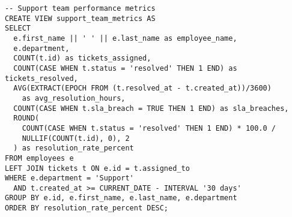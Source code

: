 \begin{verbatim}
-- Support team performance metrics
CREATE VIEW support_team_metrics AS
SELECT 
  e.first_name || ' ' || e.last_name as employee_name,
  e.department,
  COUNT(t.id) as tickets_assigned,
  COUNT(CASE WHEN t.status = 'resolved' THEN 1 END) as tickets_resolved,
  AVG(EXTRACT(EPOCH FROM (t.resolved_at - t.created_at))/3600) 
    as avg_resolution_hours,
  COUNT(CASE WHEN t.sla_breach = TRUE THEN 1 END) as sla_breaches,
  ROUND(
    COUNT(CASE WHEN t.status = 'resolved' THEN 1 END) * 100.0 / 
    NULLIF(COUNT(t.id), 0), 2
  ) as resolution_rate_percent
FROM employees e
LEFT JOIN tickets t ON e.id = t.assigned_to
WHERE e.department = 'Support'
  AND t.created_at >= CURRENT_DATE - INTERVAL '30 days'
GROUP BY e.id, e.first_name, e.last_name, e.department
ORDER BY resolution_rate_percent DESC;
\end{verbatim} 